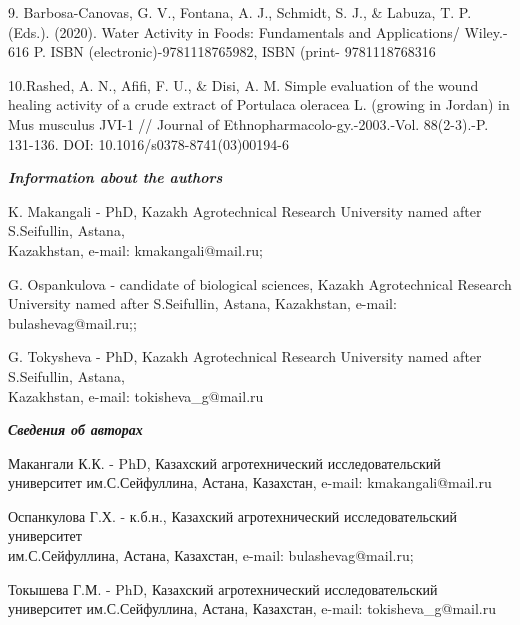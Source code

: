 \begin{noparindent}
9. Barbosa-Canovas, G. V., Fontana, A. J., Schmidt, S. J., \& Labuza, T.
P. (Eds.). (2020). Water Activity in Foods: Fundamentals and
Applications/ Wiley.- 616 P. ISBN (electronic)-9781118765982, ISBN
(print- 9781118768316

10.Rashed, A. N., Afifi, F. U., \& Disi, A. M. Simple evaluation of the
wound healing activity of a crude extract of Portulaca oleracea L.
(growing in Jordan) in Mus musculus JVI-1 // Journal of
Ethnopharmacolo-gy.-2003.-Vol. 88(2-3).-P. 131-136. DOI:
10.1016/s0378-8741(03)00194-6
\end{noparindent}

\emph{{\bfseries Information about the authors}}
\begin{noparindent}

K. Makangali - PhD, Kazakh Agrotechnical Research University named after
S.Seifullin, Astana, \\Kazakhstan, e-mail: kmakangali@mail.ru;

G. Ospankulova - candidate of biological sciences, Kazakh Agrotechnical
Research University named after S.Seifullin, Astana, Kazakhstan, e-mail:
bulashevag@mail.ru;;

G. Tokysheva - PhD, Kazakh Agrotechnical Research University named after
S.Seifullin, Astana, \\Kazakhstan, e-mail: tokisheva\_g@mail.ru
\end{noparindent}

\emph{{\bfseries Сведения об авторах}}
\begin{noparindent}

Макангали К.К. - PhD, Казахский агротехнический исследовательский
университет им.С.Сейфуллина, Астана, Казахстан, e-mail:
kmakangali@mail.ru

Оспанкулова Г.Х. - к.б.н., Казахский агротехнический исследовательский
университет \\им.С.Сейфуллина, Астана, Казахстан, e-mail:
bulashevag@mail.ru;

Токышева Г.М. - PhD, Казахский агротехнический исследовательский
университет им.С.Сейфуллина, Астана, Казахстан, e-mail:
tokisheva\_g@mail.ru

\end{noparindent}












